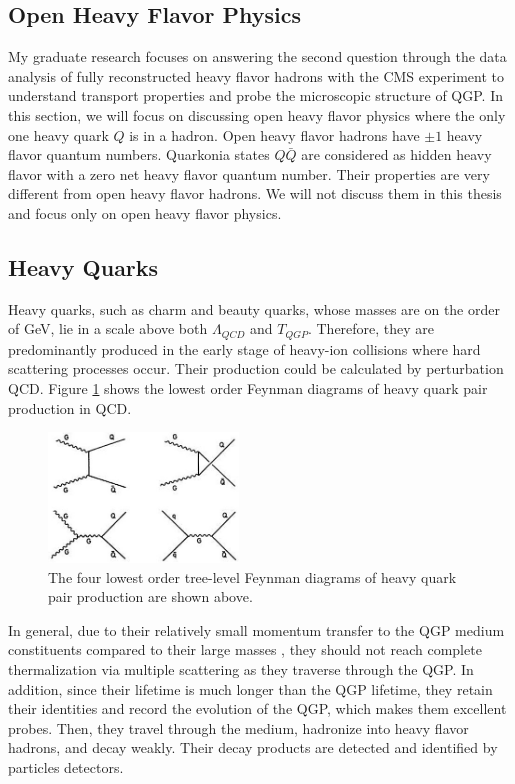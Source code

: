 \subsection{Open Heavy Flavor Physics}

My graduate research focuses on answering the second question through the data analysis of fully reconstructed heavy flavor hadrons with the CMS experiment to understand transport properties and probe the microscopic structure of QGP. In this section, we will focus on discussing open heavy flavor physics where the only one heavy quark $Q$ is in a hadron. Open heavy flavor hadrons have $\pm 1$ heavy flavor quantum numbers. Quarkonia states $Q\bar Q$ are considered as hidden heavy flavor with a zero net heavy flavor quantum number. Their properties are very different from open heavy flavor hadrons. We will not discuss them in this thesis and focus only on open heavy flavor physics. 

\subsection{Heavy Quarks}

Heavy quarks, such as charm and beauty quarks, whose masses are on the order of GeV, lie in a scale above both $\Lambda_{QCD}$ and $T_{QGP}$. Therefore, they are predominantly produced in the early stage of heavy-ion collisions where hard scattering processes occur. Their production could be calculated by perturbation QCD. Figure \ref{HQProduce} shows the lowest order Feynman diagrams of heavy quark pair production in QCD. 

 \begin{figure}[hbtp]
\begin{center}
\includegraphics[width=0.45\textwidth]{Figures/Chapter1/HQDiagram.jpg}
\caption{The four lowest order tree-level Feynman diagrams of heavy quark pair production are shown above.}
\label{HQProduce}
\end{center}
\end{figure}   

In general, due to their relatively small momentum transfer to the QGP medium constituents compared to their large masses \cite{HQReview}, they should not reach complete thermalization via multiple scattering as they traverse through the QGP. In addition, since their lifetime is much longer than the QGP lifetime, they retain their identities and record the evolution of the QGP, which makes them excellent probes. Then, they travel through the medium, hadronize into heavy flavor hadrons, and decay weakly. Their decay products are detected and identified by particles detectors.

